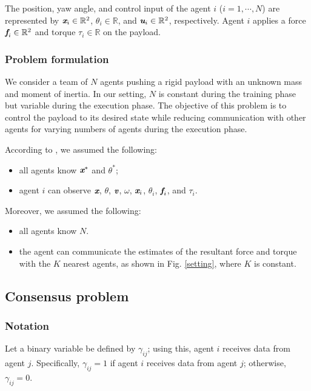\documentclass[letterpaper, 10 pt, conference]{ieeeconf} %
\begin{document}
The position, yaw angle, and control input of the agent $i$ ($i=1,\cdots,N$) are represented by $\textit{\textbf{x}}_i\in \mathbb{R}^2$, $\theta_i \in \mathbb{R}$, and $\textit{\textbf{u}}_i\in \mathbb{R}^2$, respectively.
Agent $i$ applies a force $\textit{\textbf{f}}_i \in\mathbb{R}^2$ and torque $\tau_i \in\mathbb{R}$ on the payload.

\subsubsection{Problem formulation}
We consider a team of $N$ agents pushing a rigid payload with an unknown mass and moment of inertia. In our setting, $N$ is constant during the training phase but variable during the execution phase.
The objective of this problem is to control the payload to its desired state while reducing communication with other agents for varying numbers of agents during the execution phase.

According to \cite{Culbertson2018}, we assumed the following:
\begin{itemize}
\item all agents know $\textit{\textbf{x}}^{\ast}$ and $\theta^{\ast}$;
\item agent $i$ can observe $\textit{\textbf{x}}$, $\theta$, $\textit{\textbf{v}}$, $\omega$, $\textit{\textbf{x}}_i$, $\theta_i$, $\textit{\textbf{f}}_i$, and $\tau_i$.
\end{itemize}

Moreover, we assumed the following:
\begin{itemize}
\item all agents know $N$.
\item the agent can communicate the estimates of the resultant force and torque with the $K$ nearest agents, as shown in Fig. \ref{setting}, where $K$ is constant.
\end{itemize}

\subsection{Consensus problem}
\subsubsection{Notation}
Let a binary variable be defined by $\gamma_{ij}$; using this, agent $i$ receives data from agent $j$. Specifically, $\gamma_{ij}=1$ if agent $i$ receives data from agent $j$; otherwise, $\gamma_{ij}=0$.
\end{document}

